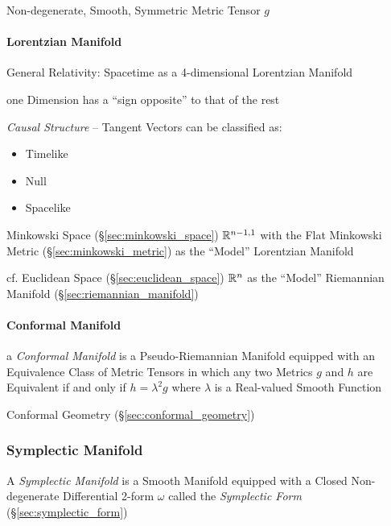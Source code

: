 Non-degenerate, Smooth, Symmetric Metric Tensor $g$



\paragraph{Lorentzian Manifold}\label{sec:lorentzian_manifold}\hfill

General Relativity: Spacetime as a 4-dimensional Lorentzian Manifold

one Dimension has a ``sign opposite'' to that of the rest

\emph{Causal Structure} -- Tangent Vectors can be classified as:
\begin{itemize}
  \item Timelike
  \item Null
  \item Spacelike
\end{itemize}

Minkowski Space (\S\ref{sec:minkowski_space}) $\mathbb{R}^{n-1,1}$
with the Flat Minkowski Metric (\S\ref{sec:minkowski_metric}) as the
``Model'' Lorentzian Manifold

cf. Euclidean Space (\S\ref{sec:euclidean_space}) $\mathbb{R}^n$ as the
``Model'' Riemannian Manifold (\S\ref{sec:riemannian_manifold})



\paragraph{Conformal Manifold}\label{sec:conformal_manifold}\hfill

a \emph{Conformal Manifold} is a Pseudo-Riemannian Manifold equipped with an
Equivalence Class of Metric Tensors in which any two Metrics $g$ and $h$ are
Equivalent if and only if $h = \lambda^2 g$ where $\lambda$ is a Real-valued
Smooth Function

\fist Conformal Geometry (\S\ref{sec:conformal_geometry})



\subsubsection{Symplectic Manifold}\label{sec:symplectic_manifold}

A \emph{Symplectic Manifold} is a Smooth Manifold equipped with a Closed
Non-degenerate Differential 2-form $\omega$ called the \emph{Symplectic Form}
(\S\ref{sec:symplectic_form})

